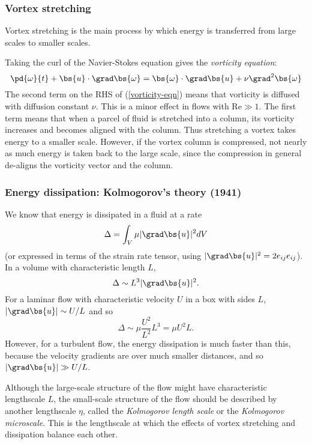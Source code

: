 \subsubsection{Vortex stretching}

Vortex stretching is the main process by which energy is transferred from large scales to smaller scales.

Taking the curl of the Navier-Stokes equation gives the \textit{vorticity equation}:
\begin{equation}
    \pd{\omega}{t} + \bs{u}\cdot\grad\bs{\omega} 
     = \bs{\omega}\cdot\grad\bs{u} + \nu\grad^2\bs{\omega}
 \label{vorticity-eqn}
\end{equation}
The second term on the RHS of (\ref{vorticity-eqn}) means that vorticity is diffused with diffusion constant $\nu$. This is a minor effect in flows with $\mathrm{Re}\gg1$. The first term means that when a parcel of fluid is stretched into a column, its vorticity increases and becomes aligned with the column. Thus stretching a vortex takes energy to a smaller scale. However, if the vortex column is compressed, not nearly as much energy is taken back to the large scale, since the compression in general de-aligns the vorticity vector and the column.

\subsubsection{Energy dissipation: Kolmogorov's theory (1941)}

We know that energy is dissipated in a fluid at a rate
\begin{equation}
	\Delta = \int_V\mu|\grad\bs{u}|^2dV
\end{equation}
(or expressed in terms of the strain rate tensor, using $|\grad\bs{u}|^2=2e_{ij}e_{ij}$). In a volume with characteristic length $L$, 
\begin{equation}
	\Delta \sim L^3 |\grad\bs{u}|^2.
\end{equation}
For a laminar flow with characteristic velocity $U$ in a box with sides $L$, $|\grad\bs{u}|\sim U/L$ and so
\begin{equation}
\Delta \sim \mu\frac{U^2}{L^2}L^3 = \mu U^2 L.
\end{equation}  
However, for a turbulent flow, the energy dissipation is much faster than this, because the velocity gradients are over much smaller distances, and so $|\grad\bs{u}|\gg U/L$. 

Although the large-scale structure of the flow might have characteristic lengthscale $L$, the small-scale structure of the flow should be described by another lengthscale $\eta$, called the \textit{Kolmogorov length scale} or the \textit{Kolmogorov microscale}. This is the lengthscale at which the effects of vortex stretching and dissipation balance each other.

